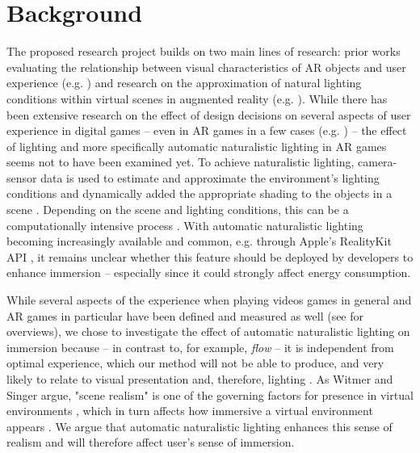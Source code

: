 \documentclass[12pt,twoside,english]{article}
\begin{document}
\section{Background}
\label{sect:background}
The proposed research project builds on two main lines of research: prior works evaluating the relationship between visual characteristics of \gls{AR} objects and user experience (e.g. \cite{gabbard_effects_2006}) and research on the approximation of natural lighting conditions within virtual scenes in augmented reality (e.g. \cite{aittala_inverse_2010}).
While there has been extensive research on the effect of design decisions on several aspects of user experience in digital games \cite{johnson_validation_2018} -- even in \gls{AR} games in a few cases (e.g. \cite{georgiou_development_2017}) -- the effect of lighting and more specifically automatic naturalistic lighting in \gls{AR} games seems not to have been examined yet.
To achieve naturalistic lighting, camera-sensor data is used to estimate and approximate the environment's lighting conditions and dynamically added the appropriate shading to the objects in a scene \cite{apple_arlightestimate_nodate,apple_pointlight_nodate}.
Depending on the scene and lighting conditions, this can be a computationally intensive process \cite{steed_constructing_2016}.
With automatic naturalistic lighting becoming increasingly available and common, e.g. through Apple's RealityKit API \cite{apple_realitykit_nodate}, it remains unclear whether this feature should be deployed by developers to enhance immersion -- especially since it could strongly affect energy consumption.

While several aspects of the experience when playing videos games in general and \gls{AR} games in particular have been defined and measured as well (see \cite{dey_systematic_2018, dunser_survey_2008} for overviews), we chose to investigate the effect of automatic naturalistic lighting on immersion because -- in contrast to, for example, \textit{flow} \cite{csikszentmihalyi_flow_1990} -- it is independent from optimal experience, which our method will not be able to produce, and very likely to relate to visual presentation and, therefore, lighting \cite{jennett_measuring_2008}.
As Witmer and Singer argue, "scene realism" is one of the governing factors for presence in virtual environments \cite{witmer_measuring_1998}, which in turn affects how immersive a virtual environment appears \cite{jennett_measuring_2008}.
We argue that automatic naturalistic lighting enhances this sense of realism and will therefore affect user's sense of immersion.
\end{document}
